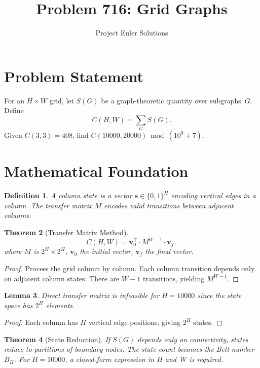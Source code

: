 \documentclass[11pt]{article}
\title{Problem 716: Grid Graphs}
\author{Project Euler Solutions}
\date{}
\newtheorem{theorem}{Theorem}
\newtheorem{lemma}[theorem]{Lemma}
\newtheorem{definition}[theorem]{Definition}
\begin{document}
\maketitle

\section{Problem Statement}

For an $H \times W$ grid, let $S(G)$ be a graph-theoretic quantity over subgraphs~$G$. Define
\[
C(H,W) = \sum_{G} S(G).
\]
Given $C(3,3)=408$, find $C(10000,20000) \bmod (10^9+7)$.

\section{Mathematical Foundation}

\begin{definition}
A \emph{column state} is a vector $\mathbf{s} \in \{0,1\}^H$ encoding vertical edges in a column. The \emph{transfer matrix} $M$ encodes valid transitions between adjacent columns.
\end{definition}

\begin{theorem}[Transfer Matrix Method]
\[
C(H,W) = \mathbf{v}_0^\top \cdot M^{W-1} \cdot \mathbf{v}_f,
\]
where $M$ is $2^H \times 2^H$, $\mathbf{v}_0$ the initial vector, $\mathbf{v}_f$ the final vector.
\end{theorem}

\begin{proof}
Process the grid column by column. Each column transition depends only on adjacent column states. There are $W-1$ transitions, yielding $M^{W-1}$.
\end{proof}

\begin{lemma}
Direct transfer matrix is infeasible for $H = 10000$ since the state space has $2^H$ elements.
\end{lemma}

\begin{proof}
Each column has $H$ vertical edge positions, giving $2^H$ states.
\end{proof}

\begin{theorem}[State Reduction]
If $S(G)$ depends only on connectivity, states reduce to partitions of boundary nodes. The state count becomes the Bell number~$B_H$. For $H = 10000$, a closed-form expression in $H$ and~$W$ is required.
\end{theorem}
\end{document}
